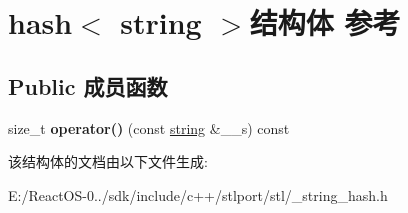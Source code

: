 \hypertarget{structhash_3_01string_01_4}{}\section{hash$<$ string $>$结构体 参考}
\label{structhash_3_01string_01_4}
\subsection*{Public 成员函数}
\begin{DoxyCompactItemize}
\item 
\mbox{\label{structhash_3_01string_01_4_ab37d488b7cd34ddb802e1c528939f67a}} 
size\+\_\+t {\bfseries operator()} (const \hyperlink{structstring}{string} \&\+\_\+\+\_\+s) const
\end{DoxyCompactItemize}


该结构体的文档由以下文件生成\+:\begin{DoxyCompactItemize}
\item 
E\+:/\+React\+O\+S-\/0../sdk/include/c++/stlport/stl/\+\_\+string\+\_\+hash.\+h\end{DoxyCompactItemize}
